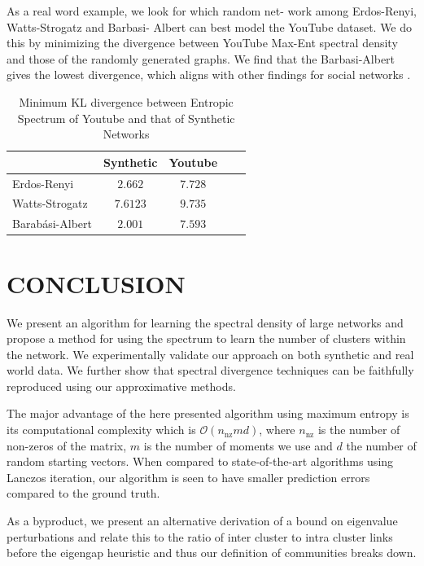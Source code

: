 \documentclass{article}
\begin{document}
As a real word example, we look for which random net- work among Erdos-Renyi, Watts-Strogatz and Barbasi- Albert can best model the YouTube dataset. We do this by minimizing the divergence between YouTube Max-Ent spectral density and those of the randomly generated graphs. We find that the Barbasi-Albert gives the lowest divergence, which aligns with other findings for social networks \citep{barabasi1999emergence}.
\begin{table}[t]
	\caption{Minimum KL divergence between Entropic Spectrum of Youtube and that of Synthetic Networks}	\label{table:learn_synnet_real_type}
	\begin{center}
		\begin{small}
			\begin{sc}
				\begin{tabular}{lcccr}
					\toprule
					& Synthetic  & Youtube \\
					\midrule
					Erdos-Renyi  & $2.662$ &$7.728$\\
					Watts-Strogatz & $7.6123$ &$ 9.735$ \\
					Barabási-Albert & $\mathbf{2.001}$ & $ \mathbf{7.593} $\\
					\midrule
				\end{tabular}
			\end{sc}
		\end{small}
	\end{center}
	\vskip -0.1in
\end{table} 


\section{CONCLUSION}
We present an algorithm for learning the spectral density of large networks and propose a method for using the spectrum to learn the number of clusters within the network. We experimentally validate our approach on both synthetic and real world data. We further show that spectral divergence techniques can be faithfully reproduced using our approximative methods. 

The major advantage of the here presented algorithm using maximum entropy is its computational complexity which is $\mathcal{O}(n_{\mathrm{nz} } m d)$, where $n_\mathrm{nz}$ is the number of non-zeros of the matrix, $m$ is the number of moments we use and $d$ the number of random starting vectors. When compared to state-of-the-art algorithms using Lanczos iteration, our algorithm is seen to have smaller prediction errors compared to the ground truth.

As a byproduct, we present an alternative derivation of a bound on eigenvalue perturbations and relate this to the ratio of inter cluster to intra cluster links before the eigengap heuristic and thus our definition of communities breaks down. 




\end{document}

